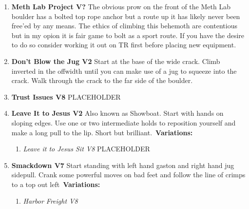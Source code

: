 \label{pt:Octurnal}
\begin{enumerate}[]
	\item\label{rt:Meth Lab Project} \colorbox{black!20}{\textbf{Meth Lab Project V?  \warn \warn \warn } }
	\newline The obvious prow on the front of the Meth Lab boulder has a bolted top rope anchor but a route up it has likely never been free'ed by any means. The ethics of climbing this behemoth are contentious but in my opion it is fair game to bolt as a sport route. If you have the desire to do so consider working it out on TR first before placing new equipment.\
	\item\label{rt:Don't Blow the Jug} \colorbox{green!20}{\textbf{Don't Blow the Jug V2    \warn } }
	\newline Start at the base of the wide crack. Climb inverted in the offwidth until you can make use of a jug to squeeze into the crack. Walk through the crack to the far side of the boulder.\
	\item\label{rt:Trust Issues} \colorbox{Goldenrod!50}{\textbf{Trust Issues V8  \warn \warn } }
	\newline PLACEHOLDER\
	\item\label{rt:Leave It to Jesus} \colorbox{green!20}{\textbf{Leave It to Jesus V2 \ding{72} \ding{72} \ding{72}  } }
	\newline Also known as Showboat. Start with hands on sloping edges. Use one or two intermediate holds to reposition yourself and make a long pull to the lip. Short but brilliant.\
	\newline \textbf{Variations:}
	\begin{enumerate}
		\item\label{vr:Leave it to Jesus Sit} \colorbox{Goldenrod!50}{\emph{Leave it to Jesus Sit V8  }  }
		\newline PLACEHOLDER\
	\end{enumerate}
	\item\label{rt:Smackdown} \colorbox{Goldenrod!50}{\textbf{Smackdown V7    } }
	\newline Start standing with left hand gaston and right hand jug sidepull. Crank some powerful moves on bad feet and follow the line of crimps to a top out left\
	\newline \textbf{Variations:}
	\begin{enumerate}
		\item\label{vr:Harbor Freight} \colorbox{Goldenrod!50}{\emph{Harbor Freight V8     }  }

\end{enumerate}
\end{enumerate}

